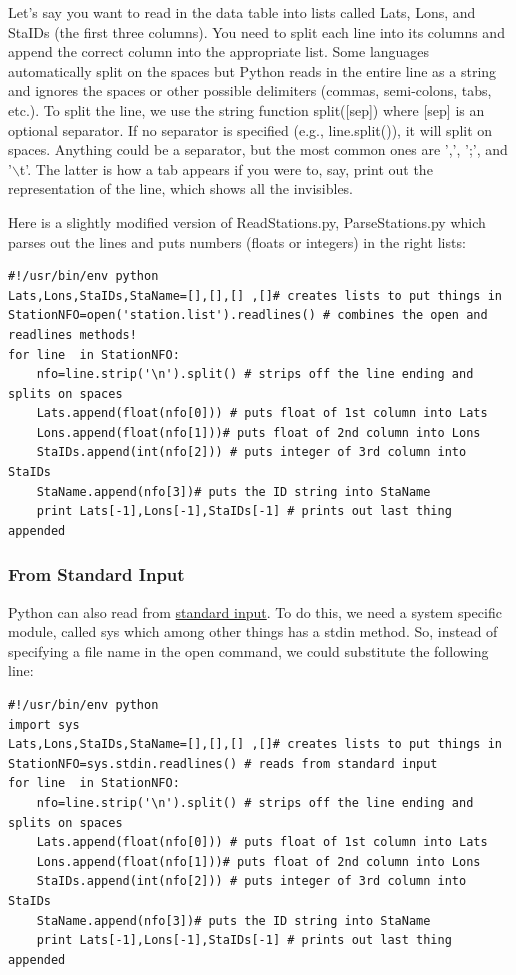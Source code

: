 \documentclass[11pt]{book}
\begin{document}
{{Let's say you want to read in the data table into lists called Lats, Lons, and StaIDs (the first three columns).  You need to split each line into its columns and append the correct column into the appropriate list.  Some languages automatically split on the spaces  but Python reads in the entire line as a string and ignores the spaces or other possible delimiters (commas, semi-colons, tabs, etc.).  To split the line, we use the string function {\color{blue}split([sep])} where {\color{blue}[sep]} is an optional separator.  If no separator is specified (e.g., {\color{blue}line.split()}), it will split on spaces.   Anything could be a separator, but the most common ones are ',', ';', and '$\backslash$t'.  The latter is how a tab appears if you were to, say, print out the representation of the line, which shows all the invisibles.

Here is a slightly modified version of {\color{blue}ReadStations.py}, {\color{blue}ParseStations.py} which parses out the lines and puts numbers (floats or integers) in the right lists:

{ \color{blue} \begin{verbatim}
#!/usr/bin/env python
Lats,Lons,StaIDs,StaName=[],[],[] ,[]# creates lists to put things in
StationNFO=open('station.list').readlines() # combines the open and readlines methods!
for line  in StationNFO:
    nfo=line.strip('\n').split() # strips off the line ending and splits on spaces
    Lats.append(float(nfo[0])) # puts float of 1st column into Lats
    Lons.append(float(nfo[1]))# puts float of 2nd column into Lons
    StaIDs.append(int(nfo[2])) # puts integer of 3rd column into StaIDs
    StaName.append(nfo[3])# puts the ID string into StaName
    print Lats[-1],Lons[-1],StaIDs[-1] # prints out last thing appended
\end{verbatim}}

 \subsubsection{From  Standard Input }

Python can also read from \href{#standard_IO}{standard input}.  To do this, we need a system specific module, called {\color{blue}sys} which among other things has a {\color{blue}stdin} method.  So, instead of specifying a file name in the {\color{blue}open} command, we could substitute the following line:


{ \color{blue} \begin{verbatim}
#!/usr/bin/env python
import sys
Lats,Lons,StaIDs,StaName=[],[],[] ,[]# creates lists to put things in
StationNFO=sys.stdin.readlines() # reads from standard input
for line  in StationNFO:
    nfo=line.strip('\n').split() # strips off the line ending and splits on spaces
    Lats.append(float(nfo[0])) # puts float of 1st column into Lats
    Lons.append(float(nfo[1]))# puts float of 2nd column into Lons
    StaIDs.append(int(nfo[2])) # puts integer of 3rd column into StaIDs
    StaName.append(nfo[3])# puts the ID string into StaName
    print Lats[-1],Lons[-1],StaIDs[-1] # prints out last thing appended
\end{verbatim}}

}}
\end{document}
